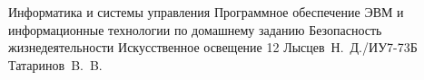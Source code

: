 \documentclass{bmstu}
\begin{document}
\makereporttitle
{Информатика и системы управления} %
{Программное обеспечение ЭВМ и информационные технологии}
{по домашнему заданию} %
{Безопасность жизнедеятельности} %
{Искусственное освещение} %
{12} %
{Лысцев~Н.~Д./ИУ7-73Б} %
{Татаринов~B.~B.} %
{}


%
%
%
%
%

\end{document}
